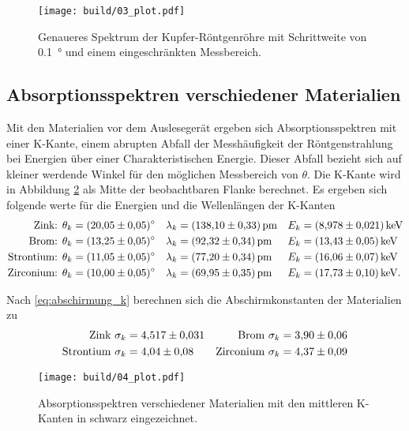 \begin{figure}
    \centering
    \texttt{[image: build/03\_plot.pdf]}
    \caption{Genaueres Spektrum der Kupfer-Röntgenröhre mit Schrittweite von \qty{0.1}{\degree} und einem eingeschränkten Messbereich.}
    \label{fig:03}
\end{figure}




\subsection{Absorptionsspektren verschiedener Materialien}
Mit den Materialien vor dem Auslesegerät ergeben sich Absorptionsspektren mit einer K-Kante, einem abrupten Abfall
der Messhäufigkeit der Röntgenstrahlung bei Energien über einer Charakteristischen Energie.
Dieser Abfall bezieht sich auf kleiner werdende Winkel für den möglichen Messbereich von $\theta$.
Die K-Kante wird in Abbildung \ref{fig:04} als Mitte der beobachtbaren Flanke berechnet.
Es ergeben sich folgende werte für die Energien und die Wellenlängen der K-Kanten
\begin{align*}
    \text{Zink:       } \theta_k &= \qty{20.05 \pm 0.05}{\degree} & \lambda_k &= \qty{138.10 \pm 0.33}{\pico\meter} & E_k &= \qty{8.978 \pm 0.021}{ \kilo\eV } \\
    \label{eq:absorptionskanten}
    \text{Brom:       } \theta_k &= \qty{13.25 \pm 0.05}{\degree} & \lambda_k &= \qty{92.32 \pm 0.34 }{\pico\meter} & E_k &= \qty{13.43 \pm 0.05 }{ \kilo\eV }\\
    \text{Strontium:  } \theta_k &= \qty{11.05 \pm 0.05}{\degree} & \lambda_k &= \qty{77.20 \pm 0.34 }{\pico\meter} & E_k &= \qty{16.06 \pm 0.07 }{ \kilo\eV }\\
    \text{Zirconium:  } \theta_k &= \qty{10.00 \pm 0.05}{\degree} & \lambda_k &= \qty{69.95 \pm 0.35 }{\pico\meter} & E_k &= \qty{17.73 \pm 0.10}{\kilo\eV}. 
\end{align*}

\noindent
Nach \eqref{eq:abschirmung_k} berechnen sich die Abschirmkonstanten der Materialien zu
\begin{align*}
    \text{Zink      } \sigma_k &= \num{4.517 \pm 0.031} &
    \text{Brom      } \sigma_k &= \num{3.90 \pm 0.06} \\
    \text{Strontium } \sigma_k &= \num{4.04 \pm 0.08} &
    \text{Zirconium } \sigma_k &= \num{4.37 \pm 0.09} 
\end{align*}

\begin{figure}
    \centering
    \texttt{[image: build/04\_plot.pdf]}
    \caption{Absorptionsspektren verschiedener Materialien mit den mittleren K-Kanten in schwarz eingezeichnet.}
    \label{fig:04}
\end{figure}






